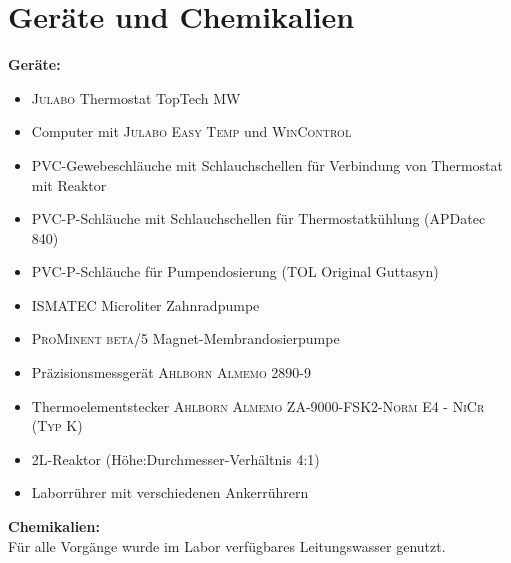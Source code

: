 \section{Geräte und Chemikalien}
\label{sec:geraete}

\textbf{Geräte:}
\begin{itemize}
	\item \textsc{Julabo} Thermostat TopTech MW
	\item Computer mit \textsc{Julabo Easy Temp} und \textsc{WinControl}
	\item PVC-Gewebeschläuche mit Schlauchschellen für Verbindung von Thermostat mit Reaktor
	\item PVC-P-Schläuche mit Schlauchschellen für Thermostatkühlung (APDatec 840) 
	\item PVC-P-Schläuche für Pumpendosierung (TOL Original Guttasyn)
	\item \textsc{ISMATEC} Microliter Zahnradpumpe
	\item \textsc{ProMinent beta/5} Magnet-Membrandosierpumpe 
	\item Präzisionsmessgerät \textsc{Ahlborn Almemo 2890-9}
	\item Thermoelementstecker \textsc{Ahlborn Almemo ZA-9000-FSK2-Norm E4 - NiCr (Typ K)}
	\item 2L-Reaktor (Höhe:Durchmesser-Verhältnis 4:1)
	\item Laborrührer mit verschiedenen Ankerrührern
\end{itemize}

\textbf{Chemikalien:}\\
Für alle Vorgänge wurde im Labor verfügbares Leitungswasser genutzt.